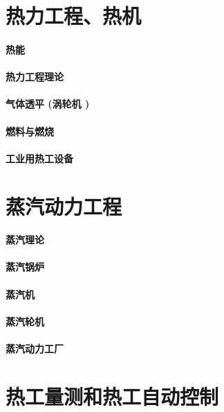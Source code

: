 \documentclass[UTF8]{../../ApplicationUniverse}
\begin{document}
\chapter{热力工程、热机}
\subsubsection{热能}
\subsubsection{热力工程理论}
\subsubsection{气体透平 (涡轮机 )}
\subsubsection{燃料与燃烧}
\subsubsection{工业用热工设备}






\chapter{蒸汽动力工程}
\subsubsection{蒸汽理论}
\subsubsection{蒸汽锅炉}
\subsubsection{蒸汽机}
\subsubsection{蒸汽轮机}
\subsubsection{蒸汽动力工厂}








\chapter{热工量测和热工自动控制}
\end{document}
